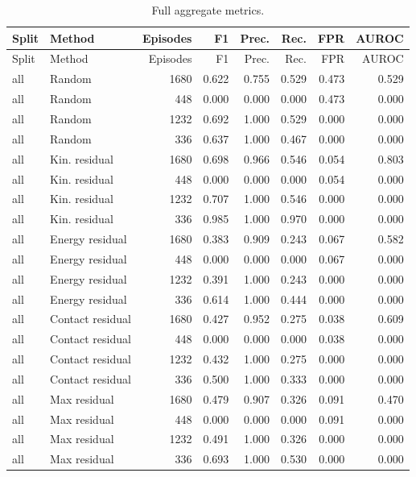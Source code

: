 {\scriptsize
\setlength{\tabcolsep}{2.5pt}
\begin{longtable}{llrrrrrr}
\caption{Full aggregate metrics.}\label{tab:full-aggregate}\\
\toprule
Split & Method & Episodes & F1 & Prec. & Rec. & FPR & AUROC \\
\midrule
\endfirsthead
\toprule
Split & Method & Episodes & F1 & Prec. & Rec. & FPR & AUROC \\
\midrule
\endhead
all & Random & 1680 & 0.622 & 0.755 & 0.529 & 0.473 & 0.529 \\
all & Random & 448 & 0.000 & 0.000 & 0.000 & 0.473 & 0.000 \\
all & Random & 1232 & 0.692 & 1.000 & 0.529 & 0.000 & 0.000 \\
all & Random & 336 & 0.637 & 1.000 & 0.467 & 0.000 & 0.000 \\
all & Kin. residual & 1680 & 0.698 & 0.966 & 0.546 & 0.054 & 0.803 \\
all & Kin. residual & 448 & 0.000 & 0.000 & 0.000 & 0.054 & 0.000 \\
all & Kin. residual & 1232 & 0.707 & 1.000 & 0.546 & 0.000 & 0.000 \\
all & Kin. residual & 336 & 0.985 & 1.000 & 0.970 & 0.000 & 0.000 \\
all & Energy residual & 1680 & 0.383 & 0.909 & 0.243 & 0.067 & 0.582 \\
all & Energy residual & 448 & 0.000 & 0.000 & 0.000 & 0.067 & 0.000 \\
all & Energy residual & 1232 & 0.391 & 1.000 & 0.243 & 0.000 & 0.000 \\
all & Energy residual & 336 & 0.614 & 1.000 & 0.444 & 0.000 & 0.000 \\
all & Contact residual & 1680 & 0.427 & 0.952 & 0.275 & 0.038 & 0.609 \\
all & Contact residual & 448 & 0.000 & 0.000 & 0.000 & 0.038 & 0.000 \\
all & Contact residual & 1232 & 0.432 & 1.000 & 0.275 & 0.000 & 0.000 \\
all & Contact residual & 336 & 0.500 & 1.000 & 0.333 & 0.000 & 0.000 \\
all & Max residual & 1680 & 0.479 & 0.907 & 0.326 & 0.091 & 0.470 \\
all & Max residual & 448 & 0.000 & 0.000 & 0.000 & 0.091 & 0.000 \\
all & Max residual & 1232 & 0.491 & 1.000 & 0.326 & 0.000 & 0.000 \\
all & Max residual & 336 & 0.693 & 1.000 & 0.530 & 0.000 & 0.000 \\

\end{longtable}}
